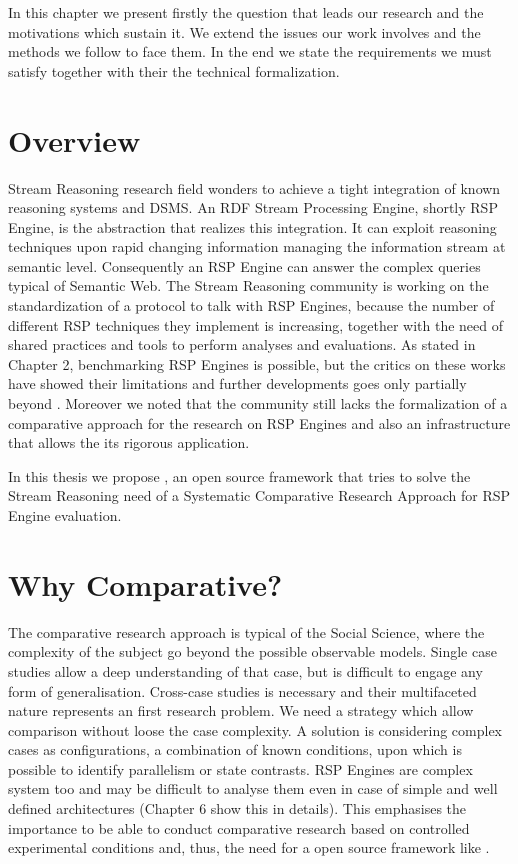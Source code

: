 In this chapter we present firstly the question that leads our research and the motivations which sustain it. We extend the issues our work involves and the methods we follow to face them. In the end we state the requirements we must satisfy together with their the technical formalization. 

\section{Overview}
Stream Reasoning research field wonders to achieve a tight integration of known reasoning systems and DSMS. An RDF Stream Processing Engine, shortly RSP Engine, is the abstraction that realizes this integration. It can exploit reasoning techniques upon rapid changing information \cite{Background SW, DSMS, SR} managing the information stream at semantic level. Consequently an RSP Engine can answer the complex queries typical of Semantic Web. The Stream Reasoning community is working on the standardization of a protocol to talk with RSP Engines, because the number of different RSP techniques they implement is increasing, together with the need of shared practices and tools to perform analyses and evaluations. As stated in Chapter 2, benchmarking RSP Engines is possible,
but the critics on these works have showed their limitations and further developments goes only partially beyond \cite{paper paper}. Moreover we noted that the community still lacks the formalization of a comparative approach for the research on RSP Engines and also an infrastructure that allows the its rigorous application.

In this thesis we propose \namens, an open source framework that tries to solve the Stream Reasoning need of a Systematic Comparative Research Approach for RSP Engine evaluation.

\section{Why Comparative?}

The comparative research approach is typical of the Social Science, where the complexity of the subject go beyond the possible observable models. Single case studies allow a deep understanding of that case, but is difficult to engage any form of generalisation. Cross-case studies is necessary and their multifaceted nature represents an first research problem. We need a strategy which allow comparison without loose the case complexity. A solution is considering complex cases as configurations, a combination of known conditions, upon which is possible to identify parallelism or state contrasts. RSP Engines are complex system too and may be difficult to analyse them even in case of simple and well defined architectures (Chapter 6 show this in details). This emphasises the importance to be able to conduct comparative research based on controlled experimental conditions and, thus, the need for a open source framework like \name.


